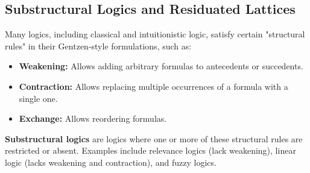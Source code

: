 {%


}



\subsection{Substructural Logics and Residuated Lattices}

Many logics, including classical and intuitionistic logic, satisfy certain "structural rules" in their Gentzen-style formulations, such as:
\begin{itemize}
    \item \textbf{Weakening:} Allows adding arbitrary formulas to antecedents or succedents.
    \item \textbf{Contraction:} Allows replacing multiple occurrences of a formula with a single one.
    \item \textbf{Exchange:} Allows reordering formulas.
\end{itemize}
\textbf{Substructural logics} are logics where one or more of these structural rules are restricted or absent. Examples include relevance logics (lack weakening), linear logic (lacks weakening and contraction), and fuzzy logics.

